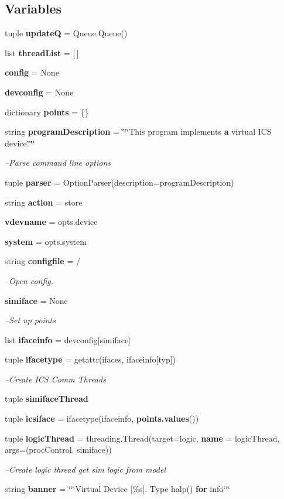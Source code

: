 \subsection*{Variables}
\begin{DoxyCompactItemize}
\item 
tuple {\bf update\+Q} = Queue.\+Queue()
\item 
list {\bf thread\+List} = [$\,$]
\item 
{\bf config} = None
\item 
{\bf devconfig} = None
\item 
dictionary {\bf points} = \{\}
\item 
string {\bf program\+Description} = \char`\"{}\char`\"{}\char`\"{}This program implements {\bf a} virtual I\+C\+S device.\char`\"{}\char`\"{}\char`\"{}
\begin{DoxyCompactList}\small\item\em --Parse command line options \end{DoxyCompactList}\item 
tuple {\bf parser} = Option\+Parser(description=program\+Description)
\item 
string {\bf action} = \textquotesingle{}store\textquotesingle{}
\item 
{\bf vdevname} = opts.\+device
\item 
{\bf system} = opts.\+system
\item 
string {\bf configfile} = \textquotesingle{}/\textquotesingle{}
\begin{DoxyCompactList}\small\item\em --Open config. \end{DoxyCompactList}\item 
{\bf simiface} = None
\begin{DoxyCompactList}\small\item\em --Set up points \end{DoxyCompactList}\item 
list {\bf ifaceinfo} = devconfig[\textquotesingle{}simiface\textquotesingle{}]
\item 
tuple {\bf ifacetype} = getattr(ifaces, ifaceinfo[\textquotesingle{}typ\textquotesingle{}])
\begin{DoxyCompactList}\small\item\em --Create I\+C\+S Comm Threads \end{DoxyCompactList}\item 
tuple {\bf simiface\+Thread}
\item 
tuple {\bf icsiface} = ifacetype(ifaceinfo, {\bf points.\+values}())
\item 
tuple {\bf logic\+Thread} = threading.\+Thread(target=logic, {\bf name} = \textquotesingle{}logic\+Thread\textquotesingle{}, args=(proc\+Control, simiface))
\begin{DoxyCompactList}\small\item\em --Create logic thread get sim logic from model \end{DoxyCompactList}\item 
string {\bf banner} = \char`\"{}\char`\"{}\char`\"{}Virtual Device [\%s]. Type halp() {\bf for} info\char`\"{}\char`\"{}\char`\"{}
\end{DoxyCompactItemize}
